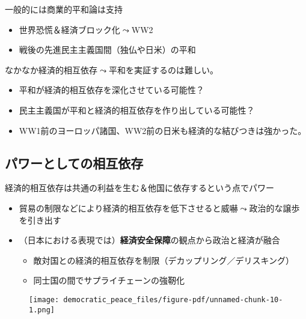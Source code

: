 \documentclass[
  xelatex,
  ja=standard]{bxjsarticle}
\providecommand{\tightlist}{%
  \setlength{\itemsep}{0pt}\setlength{\parskip}{0pt}}\usepackage{longtable,booktabs,array}
\begin{document}
一般的には商業的平和論は支持\citep{hegre2010}

\begin{itemize}
\tightlist
\item
  世界恐慌＆経済ブロック化\(\leadsto\)WW2
\item
  戦後の先進民主主義国間（独仏や日米）の平和
\end{itemize}

なかなか経済的相互依存\(\leadsto\)平和を実証するのは難しい。

\begin{itemize}
\tightlist
\item
  平和が経済的相互依存を深化させている可能性？
\item
  民主主義国が平和と経済的相互依存を作り出している可能性？
\item
  WW1前のヨーロッパ諸国、WW2前の日米も経済的な結びつきは強かった。
\end{itemize}

\hypertarget{ux30d1ux30efux30fcux3068ux3057ux3066ux306eux76f8ux4e92ux4f9dux5b58}{%
\subsection{パワーとしての相互依存}\label{ux30d1ux30efux30fcux3068ux3057ux3066ux306eux76f8ux4e92ux4f9dux5b58}}

経済的相互依存は共通の利益を生む＆他国に依存するという点でパワー\citep{waltz2010, keohane2012}

\begin{itemize}
\tightlist
\item
  貿易の制限などにより経済的相互依存を低下させると威嚇\(\leadsto\)政治的な譲歩を引き出す
\item
  （日本における表現では）\textbf{経済安全保障}の観点から政治と経済が融合

  \begin{itemize}
  \tightlist
  \item
    敵対国との経済的相互依存を制限（デカップリング／デリスキング）
  \item
    同士国の間でサプライチェーンの強靭化
  \end{itemize}
\end{itemize}

\begin{figure}[htpb]

{\centering \texttt{[image: democratic\_peace\_files/figure-pdf/unnamed-chunk-10-1.png]}

}

\end{figure}
\end{document}
